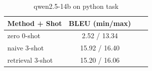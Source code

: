 \begin{table}[ht]
\centering
\small
\caption{qwen2.5-14b on python task}
\begin{tabular}{lccc}
\hline
Method + Shot & BLEU (min/max) \\
\hline
zero 0-shot & 2.52 / 13.34 \\
naive 3-shot & 15.92 / 16.40 \\
retrieval 3-shot & 15.20 / 16.06 \\
\hline
\end{tabular}
\end{table}
